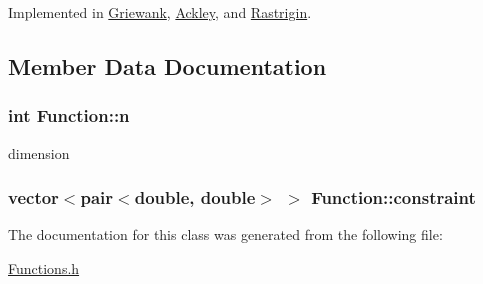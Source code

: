 Implemented in \hyperlink{classGriewank_c34b1c32bfb7b867c6772db5cc6a727f}{Griewank}, \hyperlink{classAckley_6423fcd54b72322f08357879bac580b6}{Ackley}, and \hyperlink{classRastrigin_aba8c37ab1546da6e7ed47123d179673}{Rastrigin}.

\subsection{Member Data Documentation}
\hypertarget{classFunction_2f582d2da9cb2af5507a55e17bc44083}{
\subsubsection{\setlength{\rightskip}{0pt plus 5cm}int {\bf Function::n}}}
\label{classFunction_2f582d2da9cb2af5507a55e17bc44083}


dimension \hypertarget{classFunction_e846ed04f4211984a2162b620ee91c81}{
\subsubsection{\setlength{\rightskip}{0pt plus 5cm}vector$<$pair$<$double, double$>$ $>$ {\bf Function::constraint}}}
\label{classFunction_e846ed04f4211984a2162b620ee91c81}




The documentation for this class was generated from the following file:\begin{CompactItemize}
\item 
\hyperlink{Functions_8h}{Functions.h}\end{CompactItemize}
